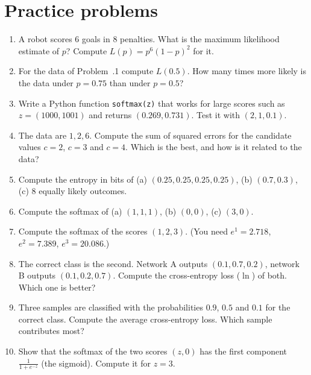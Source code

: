 \section*{Practice problems}
\begin{enumerate}[label=\textbf{\thechapter.\arabic*}]
  \item A robot scores $6$ goals in $8$ penalties. What is the maximum likelihood estimate of $p$? Compute $L(p)=p^6(1-p)^2$ for it.
  \item For the data of Problem~\thechapter.1 compute $L(0.5)$. How many times more likely is the data under $p=0.75$ than under $p=0.5$?
  \item Write a Python function \texttt{softmax(z)} that works for large scores such as $z=(1000,1001)$ and returns $(0.269,0.731)$. Test it with $(2,1,0.1)$.
  \item The data are $1,2,6$. Compute the sum of squared errors for the candidate values $c=2$, $c=3$ and $c=4$. Which is the best, and how is it related to the data?
  \item Compute the entropy in bits of (a) $(0.25,0.25,0.25,0.25)$, (b) $(0.7,0.3)$, (c) $8$ equally likely outcomes.
  \item Compute the softmax of (a) $(1,1,1)$, (b) $(0,0)$, (c) $(3,0)$.
  \item Compute the softmax of the scores $(1,2,3)$. (You need $e^1=2.718$, $e^2=7.389$, $e^3=20.086$.)
  \item The correct class is the second. Network A outputs $(0.1,0.7,0.2)$, network B outputs $(0.1,0.2,0.7)$. Compute the cross-entropy loss ($\ln$) of both. Which one is better?
  \item Three samples are classified with the probabilities $0.9$, $0.5$ and $0.1$ for the correct class. Compute the average cross-entropy loss. Which sample contributes most?
  \item[\textbf{\thechapter.10}$\star$] Show that the softmax of the two scores $(z,0)$ has the first component $\frac{1}{1+e^{-z}}$ (the sigmoid). Compute it for $z=3$.
\end{enumerate}
